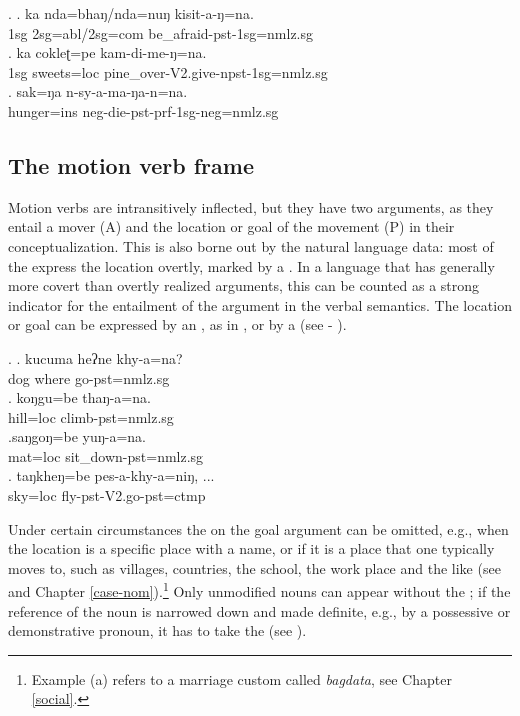 \ex. \ag.  ka nda=bhaŋ/nda=nuŋ kisit-a-ŋ=na.\\
	{\sc 1sg} {\sc 2sg=abl/2sg=com} be\_afraid-{\sc pst-1sg=nmlz.sg}\\
\bg. ka cokleʈ=pe kam-di-me-ŋ=na.\\
	{\sc 1sg} sweets{\sc =loc} pine\_over-{\sc V2.give-npst-1sg=nmlz.sg}\\
\bg. sak=ŋa n-sy-a-ma-ŋa-n=na.\\
			hunger{\sc =ins} {\sc neg-}die{\sc -pst-prf-1sg-neg=nmlz.sg}\\
				
\subsection{The motion verb frame}\label{itr-motion}
 
\noindent 
Motion verbs are intransitively inflected, but they have two arguments, as they entail a mover (A) and the location or goal of the movement (P) in their conceptualization. This is also borne out by the natural language data: most of the  express the location overtly, marked by a . In a language that has generally more covert than overtly realized arguments, this can be counted as a strong indicator for the entailment of the  argument in the verbal semantics. The location or goal can be expressed by an , as in \Next[a], or by a  (see \Next[b] - \Next[d]). 

\ex. \ag. kucuma heʔne khy-a=na?\\
		dog where go{\sc [3sg]-pst=nmlz.sg} 	\\
	\bg. koŋgu=be thaŋ-a=na.\\
		hill{\sc =loc} climb{\sc [3sg]-pst=nmlz.sg}\\
	\bg.saŋgoŋ=be yuŋ-a=na.\\
	 mat{\sc =loc} sit\_down{\sc [3sg]-pst=nmlz.sg}\\
	\bg.  taŋkheŋ=be  pes-a-khy-a=niŋ, ...\\
	 sky{\sc =loc} fly{\sc [3sg]-pst-V2.go-pst=ctmp}		\\
	 	


Under certain circumstances the  on the goal argument can be omitted, e.g., when the location is a specific place with a name, or if it is a place that one typically moves to, such as villages, countries, the school, the work place and the like (see \Next and Chapter \ref{case-nom}).\footnote{Example (a) refers to a marriage custom called \emph{bagdata}, see Chapter \ref{social}.}  Only unmodified nouns can appear without the ; if the reference of the noun is narrowed down and made definite, e.g., by a possessive or demonstrative pronoun, it has to take the   (see \Next[c]).   

